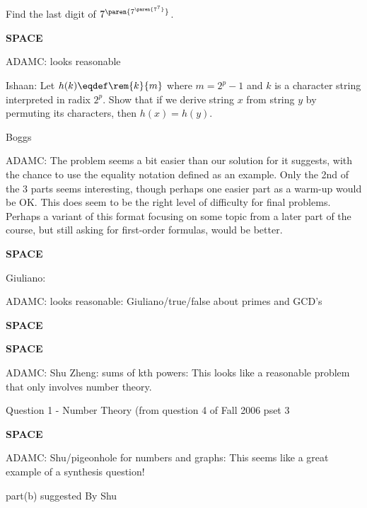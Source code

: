 \documentclass[quiz]{mcs}
\renewcommand{\examspace}{\textbf{SPACE}}
\begin{document}
Find the last digit of $7^{\paren{7^{\paren{7^7}}}}$.

\examspace
\begin{editingnotes}
ADAMC: looks reasonable
\end{editingnotes}

Ishaan: Let $h(k) \eqdef \rem{k}{m}$ where $m = 2^p - 1$ and $k$ is a
character string interpreted in radix $2^p$.  Show that if we derive
string $x$ from string $y$ by permuting its characters, then $h(x) =
h(y)$.

\begin{editingnotes}Boggs

ADAMC: The problem seems a bit easier than our solution for it
suggests, with the chance to use the equality notation defined as an
example.  Only the 2nd of the 3 parts seems interesting, though
perhaps one easier part as a warm-up would be OK.  This does seem to
be the right level of difficulty for final problems.  Perhaps a
variant of this format focusing on some topic from a later part of the
course, but still asking for first-order formulas, would be better.
\end{editingnotes}


\examspace
\begin{editingnotes}Giuliano:\end{editingnotes}


\begin{editingnotes}
ADAMC: looks reasonable: Giuliano/true/false about primes and GCD's
\end{editingnotes}

\examspace


\examspace
\begin{editingnotes}
ADAMC: Shu Zheng: sums of kth powers: This looks like a reasonable
problem that only involves number theory.

Question 1 - Number Theory (from question 4 of Fall 2006 pset 3
\end{editingnotes}


\examspace
\begin{editingnotes}
ADAMC: Shu/pigeonhole for numbers and graphs: This seems like a great
example of a synthesis question!

part(b) suggested By Shu
\end{editingnotes}
\end{document}
